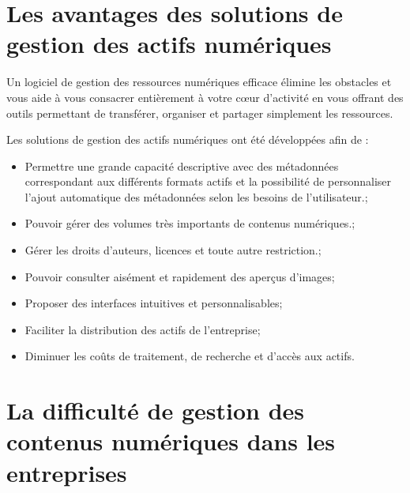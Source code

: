 \section{Les avantages des solutions de gestion des actifs numériques}

Un logiciel de gestion des ressources numériques efficace élimine les obstacles et vous aide à vous consacrer entièrement à votre cœur d’activité en vous offrant des outils permettant de transférer, organiser et partager simplement les ressources.\newline

Les solutions de gestion des actifs numériques ont été développées afin de :
\newline

\begin{itemize}
\item   Permettre une grande capacité descriptive avec des métadonnées correspondant  aux différents formats actifs et la possibilité de personnaliser  l’ajout automatique des métadonnées selon les besoins de l’utilisateur.;
\newline
\item  Pouvoir gérer des volumes très importants de contenus numériques.;
\newline
\item    Gérer les droits d’auteurs, licences et toute autre restriction.;
\newline
\item    Pouvoir consulter aisément et rapidement des aperçus d’images;
\newline
\item    Proposer des interfaces intuitives et personnalisables;
\newline
\item    Faciliter la distribution des actifs de l’entreprise;
\newline
 \item   Diminuer les coûts de traitement, de recherche et d’accès aux actifs.
 \newline
\newline
\newline
\newline
\end{itemize} 

\newpage
 \section{La difficulté de gestion des contenus numériques dans les entreprises}

